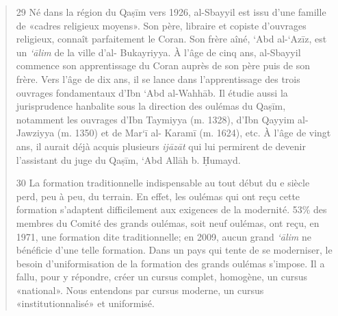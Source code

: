 \begin{quote}
29 Né dans la région du Qaṣīm vers 1926, al-Sbayyil est issu d'une
famille de «cadres religieux moyens». Son père, libraire et copiste
d'ouvrages religieux, connaît parfaitement le Coran. Son frère aîné,
`Abd al-`Azīz, est un \emph{`ālim} de la ville d'al- Bukayriyya. À l'âge
de cinq ans, al-Sbayyil commence son apprentissage du Coran auprès de
son père puis de son frère. Vers l'âge de dix ans, il se lance dans
l'apprentissage des trois ouvrages fondamentaux d'Ibn `Abd al-Wahhāb. Il
étudie aussi la jurisprudence hanbalite sous la direction des oulémas du
Qaṣīm, notamment les ouvrages d'Ibn Taymiyya (m. 1328), d'Ibn Qayyim
al-Jawziyya (m. 1350) et de Mar`ī al- Karamī (m. 1624), etc. À l'âge de
vingt ans, il aurait déjà acquis plusieurs \emph{ijāzāt} qui lui
permirent de devenir l'assistant du juge du Qaṣīm, `Abd Allāh b. Ḥumayd.

30 La formation traditionnelle indispensable au tout début du e siècle
perd, peu à peu, du terrain. En effet, les oulémas qui ont reçu cette
formation s'adaptent difficilement aux exigences de la modernité. 53\%
des membres du Comité des grands oulémas, soit neuf oulémas, ont reçu,
en 1971, une formation dite traditionnelle; en 2009, aucun grand
\emph{`ālim} ne bénéficie d'une telle formation. Dans un pays qui tente
de se moderniser, le besoin d'uniformisation de la formation des grands
oulémas s'impose. Il a fallu, pour y répondre, créer un cursus complet,
homogène, un cursus «national». Nous entendons par cursus moderne, un
cursus «institutionnalisé» et uniformisé.


\end{quote}
